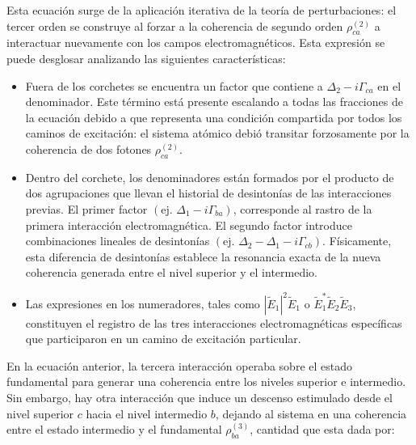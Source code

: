\documentclass[12pt,a4paper]{article}
\begin{document}
 Esta ecuación surge de la aplicación iterativa de la teoría de perturbaciones: el tercer orden se construye al forzar a la coherencia de segundo orden $\rho_{ca}^{(2)}$ a interactuar nuevamente con los campos electromagnéticos. Esta expresión se puede desglosar analizando las siguientes características:

\begin{itemize}
    \item Fuera de los corchetes se encuentra un factor que contiene a $\Delta_2 - i\Gamma_{ca}$ en el denominador. Este término está presente escalando a todas las fracciones de la ecuación debido a que representa una condición compartida por todos los caminos de excitación: el sistema atómico debió transitar forzosamente por la coherencia de dos fotones $\rho_{ca}^{(2)}$. 
    
    \item Dentro del corchete, los denominadores están formados por el producto de dos agrupaciones que llevan el historial de desintonías de las interacciones previas. El primer factor $(\text{ej. }\Delta_1 - i\Gamma_{ba})$, corresponde al rastro de la primera interacción electromagnética. El segundo factor introduce combinaciones lineales de desintonías $(\text{ej. }\Delta_2 - \Delta_1 - i\Gamma_{cb})$. Físicamente, esta diferencia de desintonías establece la resonancia exacta de la nueva coherencia generada entre el nivel superior y el intermedio.
    
    \item Las expresiones en los numeradores, tales como $|\tilde{E}_1|^2 \tilde{E}_1$ o $\tilde{E}_1^* \tilde{E}_2 \tilde{E}_3$, constituyen el registro de las tres interacciones electromagnéticas específicas que participaron en un camino de excitación particular.
\end{itemize}

En la ecuación anterior, la tercera interacción operaba sobre el estado fundamental para generar una coherencia entre los niveles superior e intermedio. Sin embargo, hay otra interacción que induce un descenso estimulado desde el nivel superior $c$ hacia el nivel intermedio $b$, dejando al sistema en una coherencia entre el estado intermedio y el fundamental $\rho_{ba}^{(3)}$, cantidad que esta dada por: 
\end{document}

